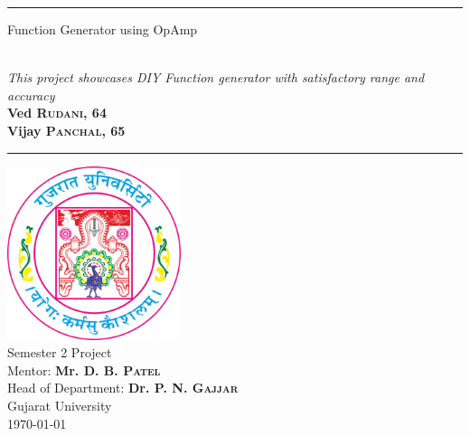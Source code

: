 \documentclass[14pt,a4paper]{extarticle}
\author{vijay panchal}
\date{\today}
\title{}
\begin{document}
\vspace*{\fill}
\normalsize
\noindent\rule{\linewidth}{.7ex}
\begin{flushright}
\begin{huge}\color{schrift}Function Generator using OpAmp\end{huge}\\
\vspace{.5cm} \large \textit{This project showcases DIY Function generator with 
satisfactory range and accuracy}\\
\vspace{1cm} \textbf{Ved \textsc{Rudani}, 64}\\
\vspace{0.1cm} \textbf{Vijay \textsc{Panchal}, 65}\\
\end{flushright}
\noindent\rule{\linewidth}{.7ex}


\vspace{2cm}
\begin{center}
    \includegraphics[width=2in]{extras/logo_em.png} \\
    \Large Semester 2 Project \\
   \large Mentor: \textbf{Mr. D. B. \textsc{Patel}}\\
    \large Head of Department: \textbf{Dr. P. N. \textsc{Gajjar}}\\
    \large {Gujarat University}\\
    \large \today
  \end{center}
\vspace*{\fill}
\setcounter{page}{1}
\pagebreak
\end{document}
